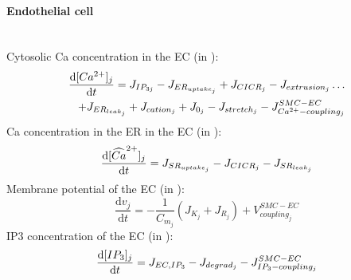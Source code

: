 \documentclass[fleqn]{report}
\numberwithin{equation}{section}
\numberwithin{equation}{section}
\begin{document}
	\paragraph{Endothelial cell}~\\
	Cytosolic \gls{Ca} concentration in the \gls{EC} (in \uM):
	\begin{equation} \label{eq:cj}
	\begin{split}
	\dfrac{\mathrm{d}[Ca^{2+}]_{j}}{\mathrm{d}t} = J_{IP_{3j}} - J_{ER_{uptake_{j}}} + J_{CICR_{j}} - J_{extrusion_{j}}\dots \\
	 + J_{ER_{leak_{j}}} + J_{cation_{j}} + J_{0_{j}} - J_{stretch_{j}} - J_{Ca^{2+}-coupling_{j}}^{SMC-EC}
	\end{split}
	\end{equation}
	\gls{Ca} concentration in the \gls{ER} in the \gls{EC} (in \uM): %
	\begin{equation} \label{eq:sj}
	\dfrac{\mathrm{d}[\widehat{Ca}^{2+}]_{j}}{\mathrm{d}t} =  J_{SR_{uptake_{j}}} - J_{CICR_{j}} - J_{SR_{leak_{j}}}
	\end{equation}
	Membrane potential of the \gls{EC} (in \mV):
	\begin{equation} \label{eq:dvjdt}
	\dfrac{\mathrm{d}v_{j}}{\mathrm{d}t} =-\frac{1}{C_{m_{j}}} ( J_{K_{j}}+J_{R_{j}}) + V^{SMC-EC}_{coupling_{j}}
	\end{equation}
	\gls{IP3} concentration of the \gls{EC} (in \uM):
	\begin{equation} \label{eq:dIjdt}
	\dfrac{\mathrm{d}[IP_{3}]_{j}}{\mathrm{d}t} =  J_{EC,IP_3}- J_{degrad_{j}}  - J^{SMC-EC}_{IP_{3}-coupling_{j}}
	\end{equation}
\end{document}

